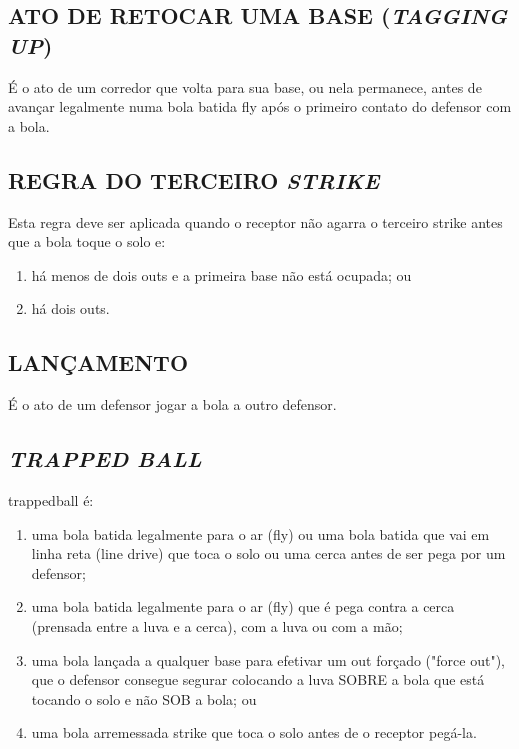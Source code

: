 \subsection{ATO DE RETOCAR UMA BASE (\textit{TAGGING UP})}

 É o ato de um corredor que volta para sua base, ou nela permanece, antes de avançar legalmente numa bola batida \gls{fly} após o primeiro contato do defensor  com a bola.

\subsection{REGRA DO TERCEIRO \textit{STRIKE}}

 Esta regra deve ser aplicada quando o receptor não agarra o terceiro \gls{strike} antes que a bola toque o solo e:

	\begin{enumerate}[label=(\alph*)]\item   há menos de dois \glspl{out} e a primeira base não está ocupada; ou
		\item  há dois \glspl{out}.
	\end{enumerate}

\subsection{LANÇAMENTO}

É o ato de um defensor jogar a bola a outro defensor.

\subsection{\textit{TRAPPED BALL}}
 \gls{trappedball} é:

\begin{enumerate}[label=(\alph*)]
	\item   uma bola batida legalmente para o ar (\gls{fly}) ou uma bola batida que vai em linha reta (\gls{line drive}) que toca o solo ou uma cerca antes de ser pega por um defensor;
	\item  uma bola batida legalmente para o ar (\gls{fly}) que é pega contra a cerca (prensada entre a luva e a cerca), com a luva ou com a mão;
	\item  uma bola lançada a qualquer base para efetivar um \gls{out} forçado ("force out"), que o defensor consegue segurar colocando a luva SOBRE a bola que está tocando o solo e não SOB a bola; ou
	\item  uma bola arremessada \gls{strike} que toca o solo antes de o receptor pegá-la.
\end{enumerate}

